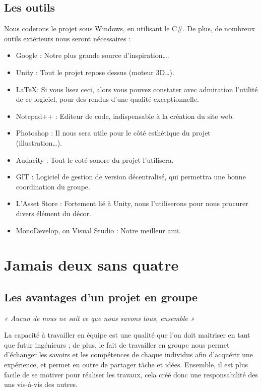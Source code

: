 \documentclass[12pt]{article}
\begin{document}
\subsection{Les outils}

Nous coderons le projet sous Windows, en utilisant le C\#. De plus, de nombreux outils extérieurs nous seront nécessaires :\\

\begin{itemize}
\item Google : Notre plus grande source d’inspiration….
\item Unity : Tout le projet repose dessus (moteur 3D…).
\item\LaTeX : Si vous lisez ceci, alors vous pouvez constater avec admiration l’utilité de ce logiciel, pour des rendus d’une qualité exceptionnelle.
\item Notepad++ : Editeur de code, indispensable à la création du site web.
\item Photoshop : Il nous sera utile pour le côté esthétique du projet (illustration…).
\item Audacity : Tout le coté sonore du projet l’utilisera.
\item GIT : Logiciel de gestion de version décentralisé, qui permettra une bonne coordination du groupe.
\item L’Asset Store : Fortement lié à Unity, nous l’utiliserons pour nous procurer divers élément du décor.
\item MonoDevelop, ou Visual Studio : Notre meilleur ami.
\end{itemize}

\newpage
\section{Jamais deux sans quatre}

\subsection{Les avantages d’un projet en groupe}

\begin{center}
\textit{« Aucun de nous ne sait ce que nous savons tous, ensemble »}
\end{center}

La capacité à travailler en équipe est une qualité que l’on doit maitriser en tant que futur ingénieurs ; de plus, le fait de travailler en groupe nous permet d’échanger les savoirs et les compétences de chaque individus afin d’acquérir une expérience, et permet en outre de partager tâche et idées. Ensemble, il est plus facile de se motiver pour réaliser les travaux, cela créé donc une responsabilité des uns vis-à-vis des autres.
\end{document}
